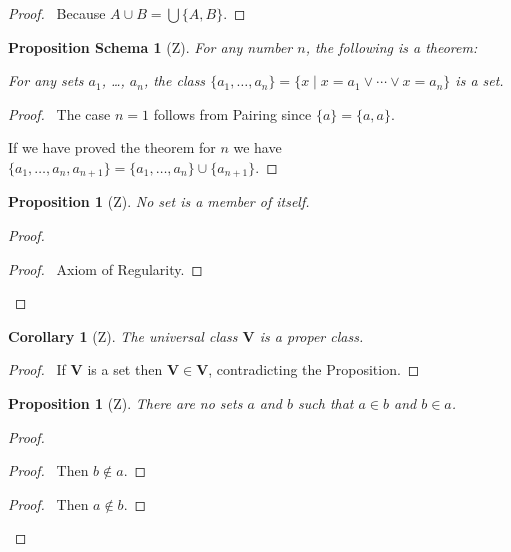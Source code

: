 \documentclass{book}
\let\qed\relax
\newtheorem{prop}[ax]{Proposition}
\newtheorem{props}[ax]{Proposition Schema}
\newtheorem{cor}{Corollary}[ax]
\theoremstyle{definition}
\begin{document}
\begin{proof}
\pf\ Because $A \cup B = \bigcup \{A,B\}$. \qed
\end{proof}

\begin{props}[Z]
For any number $n$, the following is a theorem:

For any sets $a_1$, \ldots, $a_n$, the class $\{a_1, \ldots, a_n\} = \{x \mid x = a_1 \vee \cdots \vee x = a_n\}$ is a set.
\end{props}

\begin{proof}
\pf\ The case $n=1$ follows from Pairing since $\{a\} = \{a,a\}$.

If we have proved the theorem for $n$ we have $\{a_1, \ldots, a_n, a_{n+1}\} = \{a_1, \ldots, a_n\} \cup \{a_{n+1}\}$. \qed
\end{proof}

\begin{prop}[Z]
\label{prop:xnotinx}
No set is a member of itself.
\end{prop}

\begin{proof}
\pf
{}
\begin{proof}
	\pf\ Axiom of Regularity.
\end{proof}
\qed
\end{proof}

\begin{cor}[Z]
The universal class $\mathbf{V}$ is a proper class.
\end{cor}

\begin{proof}
\pf\ If $\mathbf{V}$ is a set then $\mathbf{V} \in \mathbf{V}$, contradicting the Proposition. \qed
\end{proof}

\begin{prop}[Z]
There are no sets $a$ and $b$ such that $a \in b$ and $b \in a$.
\end{prop}

\begin{proof}
\pf
{}
\begin{proof}
	\pf\ Then $b \notin a$.
\end{proof}
\begin{proof}
	\pf\ Then $a \notin b$.
\end{proof}
\qed
\end{proof}
\end{document}
